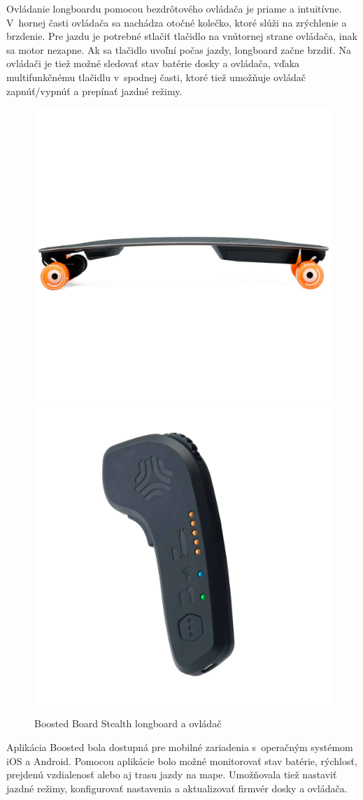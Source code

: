 Ovládanie longboardu pomocou bezdrôtového ovládača je priame a intuitívne.
V~hornej časti ovládača sa nachádza otočné kolečko, ktoré slúži na zrýchlenie a brzdenie.
Pre jazdu je potrebné stlačiť tlačidlo na vnútornej strane ovládača, inak sa motor nezapne.
Ak sa tlačidlo uvoľní počas jazdy, longboard začne brzdiť.
Na ovládači je tiež možné sledovať stav batérie dosky a ovládača, vďaka multifunkčnému tlačidlu v~spodnej časti, ktoré tiež umožňuje ovládač zapnúť/vypnúť a prepínať jazdné režimy.\cite{BoostedManual}

\begin{figure}[h]
    \centering
    \includegraphics[width=0.48\linewidth]{obrazky-figures/brand-reviews/boosted-longboard.png}\hfill
    \includegraphics[width=0.48\linewidth]{obrazky-figures/brand-reviews/boosted-controller.png}
    \caption{Boosted Board Stealth longboard a ovládač\cite{BoostedGuys}}\label{fig:boosted}
\end{figure}

Aplikácia Boosted bola dostupná pre mobilné zariadenia s~operačným systémom iOS a Android.
Pomocou aplikácie bolo možné monitorovať stav batérie, rýchlosť, prejdenú vzdialenosť alebo aj trasu jazdy na mape.
Umožňovala tiež nastaviť jazdné režimy, konfigurovať nastavenia a aktualizovať firmvér dosky a ovládača.\cite{BoostedApp}

